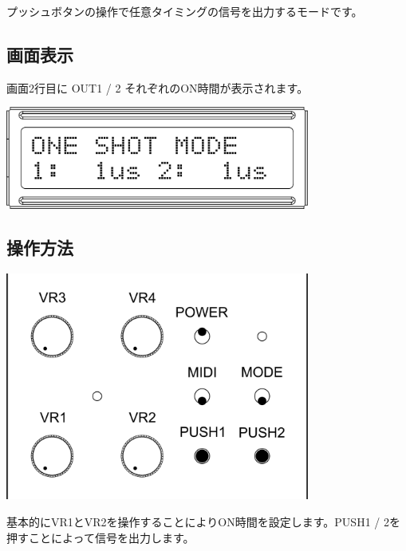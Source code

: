 \documentclass[a4paper,11pt]{jsarticle}
\begin{document}
プッシュボタンの操作で任意タイミングの信号を出力するモードです。

\subsection{画面表示}

画面2行目に OUT1 / 2 それぞれのON時間が表示されます。

\vspace*{5mm}
\begin{center}
\includegraphics[width=100mm]{image/Arduino_Interrupter_v1_LCD_OS.png}
\end{center}
\vspace*{5mm}

\subsection{操作方法}

\vspace*{5mm}
\begin{center}
\includegraphics[width=100mm]{image/Arduino_Interrupter_v1_Design_Interrupter.png}
\end{center}
\vspace*{5mm}

基本的にVR1とVR2を操作することによりON時間を設定します。PUSH1 / 2を押すことによって信号を出力します。

\vspace*{5mm}
\end{document}
